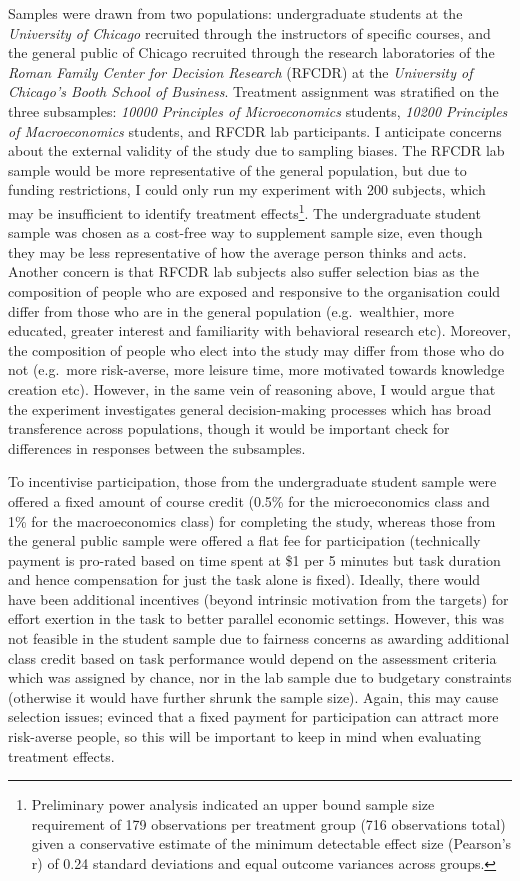 \documentclass[12pt, letterpaper]{article}
\begin{document}
Samples were drawn from two populations: undergraduate students at the \emph{University of Chicago} recruited through the instructors of specific courses, and the general public of Chicago recruited through the research laboratories of the \emph{Roman Family Center for Decision Research} (RFCDR) at the \emph{University of Chicago's Booth School of Business}. Treatment assignment was stratified on the three subsamples: \emph{10000 Principles of Microeconomics} students, \emph{10200 Principles of Macroeconomics} students, and RFCDR lab participants. I anticipate concerns about the external validity of the study due to sampling biases. The RFCDR lab sample would be more representative of the general population, but due to funding restrictions, I could only run my experiment with 200 subjects, which may be insufficient to identify treatment effects\footnote{Preliminary power analysis indicated an upper bound sample size requirement of 179 observations per treatment group (716 observations total) given a conservative estimate of the minimum detectable effect size (Pearson's r) of 0.24 standard deviations and equal outcome variances across groups.}. The undergraduate student sample was chosen as a cost-free way to supplement sample size, even though they may be less representative of how the average person thinks and acts. Another concern is that RFCDR lab subjects also suffer selection bias as the composition of people who are exposed and responsive to the organisation could differ from those who are in the general population (e.g.~wealthier, more educated, greater interest and familiarity with behavioral research etc). Moreover, the composition of people who elect into the study may differ from those who do not (e.g.~more risk-averse, more leisure time, more motivated towards knowledge creation etc). However, in the same vein of reasoning above, I would argue that the experiment investigates general decision-making processes which has broad transference across populations, though it would be important check for differences in responses between the subsamples.

To incentivise participation, those from the undergraduate student sample were offered a fixed amount of course credit (0.5\% for the microeconomics class and 1\% for the macroeconomics class) for completing the study, whereas those from the general public sample were offered a flat fee for participation (technically payment is pro-rated based on time spent at \$1 per 5 minutes but task duration and hence compensation for just the task alone is fixed). Ideally, there would have been additional incentives (beyond intrinsic motivation from the targets) for effort exertion in the task to better parallel economic settings. However, this was not feasible in the student sample due to fairness concerns as awarding additional class credit based on task performance would depend on the assessment criteria which was assigned by chance, nor in the lab sample due to budgetary constraints (otherwise it would have further shrunk the sample size). Again, this may cause selection issues; \textcite{harrison.2009.riskattitudes} evinced that a fixed payment for participation can attract more risk-averse people, so this will be important to keep in mind when evaluating treatment effects.
\end{document}
